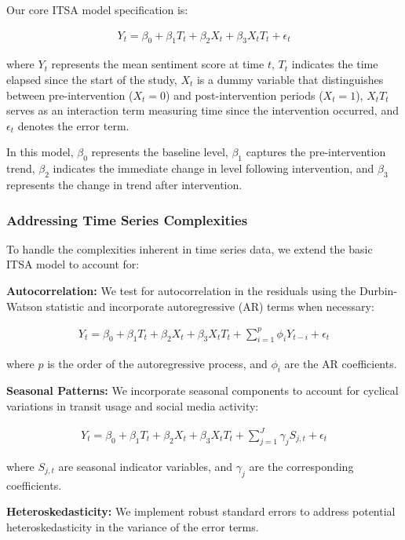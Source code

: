 \documentclass[a4paper,fleqn,12pt]{cas-sc}
\begin{document}
Our core ITSA model specification is:

\begin{align}
Y_t = \beta_0 + \beta_1 T_t + \beta_2 X_t + \beta_3 X_t T_t + \epsilon_t
\end{align}

where $Y_t$ represents the mean sentiment score at time $t$, $T_t$ indicates the time elapsed since the start of the study, $X_t$ is a dummy variable that distinguishes between pre-intervention ($X_t = 0$) and post-intervention periods ($X_t = 1$), $X_t T_t$ serves as an interaction term measuring time since the intervention occurred, and $\epsilon_t$ denotes the error term.

In this model, $\beta_0$ represents the baseline level, $\beta_1$ captures the pre-intervention trend, $\beta_2$ indicates the immediate change in level following intervention, and $\beta_3$ represents the change in trend after intervention.

\subsubsection{Addressing Time Series Complexities}

To handle the complexities inherent in time series data, we extend the basic ITSA model to account for:

\textbf{Autocorrelation:} We test for autocorrelation in the residuals using the Durbin-Watson statistic and incorporate autoregressive (AR) terms when necessary:

\begin{align}
Y_t = \beta_0 + \beta_1 T_t + \beta_2 X_t + \beta_3 X_t T_t + \sum_{i=1}^{p} \phi_i Y_{t-i} + \epsilon_t
\end{align}

where $p$ is the order of the autoregressive process, and $\phi_i$ are the AR coefficients.

\textbf{Seasonal Patterns:} We incorporate seasonal components to account for cyclical variations in transit usage and social media activity:

\begin{align}
Y_t = \beta_0 + \beta_1 T_t + \beta_2 X_t + \beta_3 X_t T_t + \sum_{j=1}^{J} \gamma_j S_{j,t} + \epsilon_t
\end{align}

where $S_{j,t}$ are seasonal indicator variables, and $\gamma_j$ are the corresponding coefficients.

\textbf{Heteroskedasticity:} We implement robust standard errors to address potential heteroskedasticity in the variance of the error terms.
\end{document}
